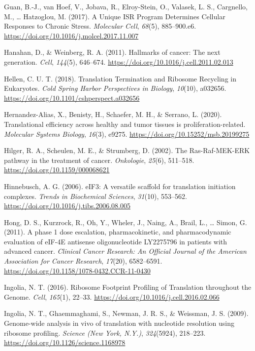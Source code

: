 \documentclass[12pt,openany]{book}
\begin{document}
\hypertarget{ref-Guan2017}{}
Guan, B.-J., van Hoef, V., Jobava, R., Elroy-Stein, O., Valasek, L. S.,
Cargnello, M., \ldots{} Hatzoglou, M. (2017). A Unique ISR Program
Determines Cellular Responses to Chronic Stress. \emph{Molecular Cell},
\emph{68}(5), 885--900.e6.
\url{https://doi.org/10.1016/j.molcel.2017.11.007}

\hypertarget{ref-Hanahan2011}{}
Hanahan, D., \& Weinberg, R. A. (2011). Hallmarks of cancer: The next
generation. \emph{Cell}, \emph{144}(5), 646--674.
\url{https://doi.org/10.1016/j.cell.2011.02.013}

\hypertarget{ref-Hellen2018}{}
Hellen, C. U. T. (2018). Translation Termination and Ribosome Recycling
in Eukaryotes. \emph{Cold Spring Harbor Perspectives in Biology},
\emph{10}(10), a032656.
\url{https://doi.org/10.1101/cshperspect.a032656}

\hypertarget{ref-Hernandez-Alias2020}{}
Hernandez-Alias, X., Benisty, H., Schaefer, M. H., \& Serrano, L.
(2020). Translational efficiency across healthy and tumor tissues is
proliferation-related. \emph{Molecular Systems Biology}, \emph{16}(3),
e9275. \url{https://doi.org/10.15252/msb.20199275}

\hypertarget{ref-Hilger2002}{}
Hilger, R. A., Scheulen, M. E., \& Strumberg, D. (2002). The
Ras-Raf-MEK-ERK pathway in the treatment of cancer. \emph{Onkologie},
\emph{25}(6), 511--518. \url{https://doi.org/10.1159/000068621}

\hypertarget{ref-Hinnebusch2006}{}
Hinnebusch, A. G. (2006). eIF3: A versatile scaffold for translation
initiation complexes. \emph{Trends in Biochemical Sciences},
\emph{31}(10), 553--562.
\url{https://doi.org/10.1016/j.tibs.2006.08.005}

\hypertarget{ref-Hong2011}{}
Hong, D. S., Kurzrock, R., Oh, Y., Wheler, J., Naing, A., Brail, L.,
\ldots{} Simon, G. (2011). A phase 1 dose escalation, pharmacokinetic,
and pharmacodynamic evaluation of eIF-4E antisense oligonucleotide
LY2275796 in patients with advanced cancer. \emph{Clinical Cancer
Research: An Official Journal of the American Association for Cancer
Research}, \emph{17}(20), 6582--6591.
\url{https://doi.org/10.1158/1078-0432.CCR-11-0430}

\hypertarget{ref-Ingolia2016}{}
Ingolia, N. T. (2016). Ribosome Footprint Profiling of Translation
throughout the Genome. \emph{Cell}, \emph{165}(1), 22--33.
\url{https://doi.org/10.1016/j.cell.2016.02.066}

\hypertarget{ref-Ingolia2009}{}
Ingolia, N. T., Ghaemmaghami, S., Newman, J. R. S., \& Weissman, J. S.
(2009). Genome-wide analysis in vivo of translation with nucleotide
resolution using ribosome profiling. \emph{Science (New York, N.Y.)},
\emph{324}(5924), 218--223.
\url{https://doi.org/10.1126/science.1168978}
\end{document}
